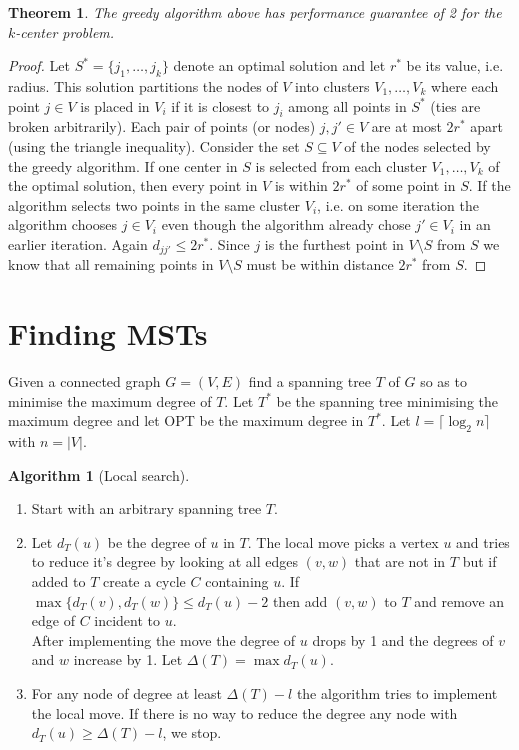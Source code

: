 \documentclass{article}
\newtheorem*{thm}{Theorem}
\theoremstyle{definition}
\newtheorem*{alg}{Algorithm}
\begin{document}
\begin{thm}
The greedy algorithm above has performance guarantee of 2 for the $k$-center problem.
\end{thm}
\begin{proof}
Let $S^*=\{j_1,\ldots,j_k\}$ denote an optimal solution and let $r^*$ be its value, i.e. radius.
This solution partitions the nodes of $V$ into clusters $V_1,\ldots,V_k$ where each point $j\in V$ is placed in $V_i$ if it is closest to $j_i$ among all points in $S^*$ (ties are broken arbitrarily).
Each pair of points (or nodes) $j,j'\in V$ are at most $2r^*$ apart (using the triangle inequality).
Consider the set $S\subseteq V$ of the nodes selected by the greedy algorithm.
If one center in $S$ is selected from each cluster $V_1,\ldots,V_k$ of the optimal solution, then every point in $V$ is within $2r^*$ of some point in $S$.
If the algorithm selects two points in the same cluster $V_i$, i.e. on some iteration the algorithm chooses $j\in V_i$ even though the algorithm already chose $j'\in V_i$ in an earlier iteration.
Again $d_{jj'}\le 2r^*$.
Since $j$ is the furthest point in $V\setminus S$ from $S$ we know that all remaining points in $V\setminus S$ must be within distance $2r^*$ from $S$.
\end{proof}


\section{Finding MSTs}
Given a connected graph $G=(V,E)$ find a spanning tree $T$ of $G$ so as to minimise the maximum degree of $T$.
Let $T^*$ be the spanning tree minimising the maximum degree and let OPT be the maximum degree in $T^*$.
Let $l =\lceil \log_2n\rceil$ with $n = |V|$.

\begin{alg}[Local search]~\\
\begin{enumerate}
\item Start with an arbitrary spanning tree $T$.
\item Let $d_T(u)$ be the degree of $u$ in $T$.
The local move picks a vertex $u$ and tries to reduce it's degree by looking at all edges $(v,w)$ that are not in $T$ but if added to $T$ create a cycle $C$ containing $u$.
If $\max\{d_T(v),d_T(w)\} \le d_T(u)-2$ then add $(v,w)$ to $T$ and remove an edge of $C$ incident to $u$. \\
After implementing the move the degree of $u$ drops by 1 and the degrees of $v$ and $w$ increase by 1.
Let $\Delta(T) = \max d_T(u)$.
\item For any node of degree at least $\Delta(T) - l $ the algorithm tries to implement the local move.
If there is no way to reduce the degree any node with $d_T(u)\ge \Delta(T) - l$, we stop.
\end{enumerate}
\end{alg}
\end{document}
